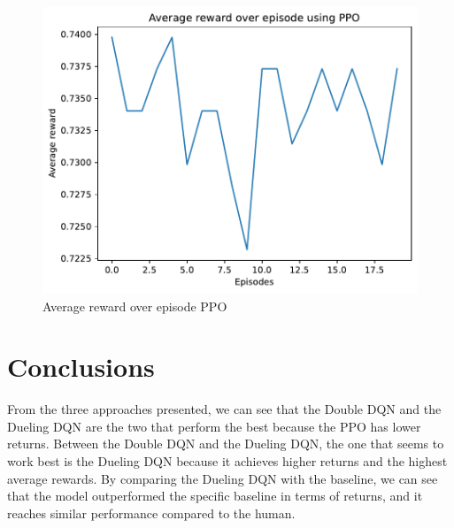 \documentclass{article}
\begin{document}
\begin{figure}
    \centering
    \includegraphics[width=0.7\linewidth]{img/Average_reward_over_episode_PPO_4000.pdf}
    \caption{Average reward over episode PPO}
    \label{fig:Reward_episode_PPO}
\end{figure}

\section{Conclusions} \label{section:Conclusions}
From the three approaches presented, we can see that the Double DQN and the Dueling DQN are the two that perform the best because the PPO has lower returns. Between the Double DQN and the Dueling DQN, the one that seems to work best is the Dueling DQN because it achieves higher returns and the highest average rewards.
By comparing the Dueling DQN with the baseline, we can see that the model outperformed the specific baseline in terms of returns, and it reaches similar performance compared to the human.



\end{document}
